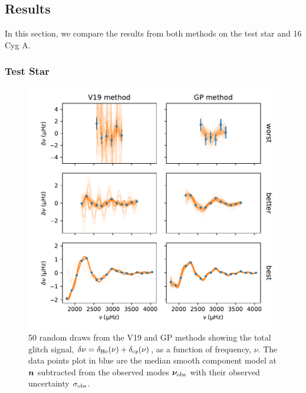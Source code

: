 
\subsection{Results}\label{sec:glitch-results}

In this section, we compare the results from both methods on the test star and 16 Cyg A.


\subsubsection{Test Star}

\begin{figure}
    \centering
    \includegraphics{figures/glitch-test-signal.pdf}
    \caption{50 random draws from the V19 and GP methods showing the total glitch signal, \(\delta\nu = \delta_{{\mathrm{He}}}(\nu) + \delta_{{\mathrm{cz}}}(\nu)\), as a function of frequency, \(\nu\). The data points plot in blue are the median smooth component model at \(\bm{n}\) subtracted from the observed modes \(\bm{\nu}_{{\mathrm{obs}}}\) with their observed uncertainty \(\sigma_{{\mathrm{obs}}}\).}
    \label{fig:glitch-test-signal}
\end{figure}

